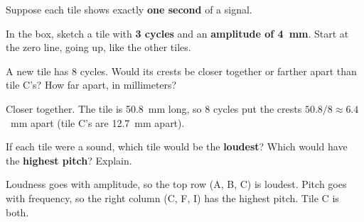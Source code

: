 \documentclass[11pt,addpoints]{exam}
\newcommand{\blank}[1][3cm]{\underline{\hspace{#1}}}
\begin{document}
\begin{questions}
\question Suppose each tile shows exactly \textbf{one second} of a signal.

\question[3] In the box, sketch a tile with \textbf{3 cycles} and an \textbf{amplitude of 4~mm}.
Start at the zero line, going up, like the other tiles.
\begin{center}
\end{center}

\question[2] A new tile has 8 cycles. Would its crests be closer together or farther apart than
tile C's? How far apart, in millimeters?
\begin{solution}
Closer together. The tile is 50.8~mm long, so 8 cycles put the crests \(50.8 / 8 \approx 6.4\)~mm
apart (tile C's are 12.7~mm apart).
\end{solution}
\vspace{1.4cm}

\question[2] If each tile were a sound, which tile would be the \textbf{loudest}? Which would have
the \textbf{highest pitch}? Explain.
\begin{solution}
Loudness goes with amplitude, so the top row (A, B, C) is loudest. Pitch goes with frequency, so
the right column (C, F, I) has the highest pitch. Tile C is both.
\end{solution}
\vspace{1.4cm}


\end{questions}
\end{document}

